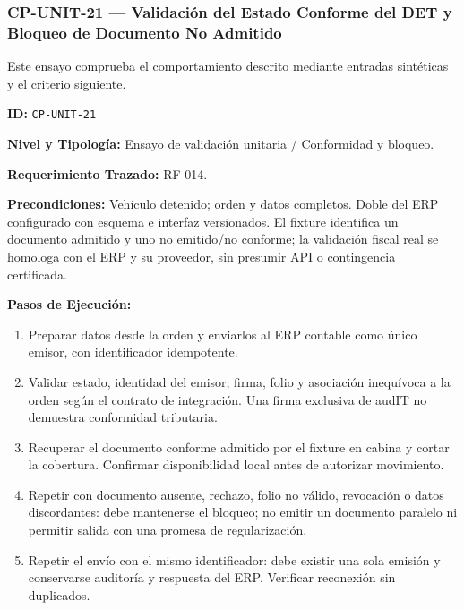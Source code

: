 \subsubsection*{CP-UNIT-21 — Validación del Estado Conforme del DET y Bloqueo de Documento No Admitido}\label{sec:9-cp-unit-21}
Este ensayo comprueba el comportamiento descrito mediante entradas sintéticas y el criterio siguiente.

\par\noindent\textbf{ID:} \texttt{C\allowbreak{}P\allowbreak{}-\allowbreak{}U\allowbreak{}N\allowbreak{}I\allowbreak{}T\allowbreak{}-\allowbreak{}2\allowbreak{}1\allowbreak{}}\par
\par\noindent\textbf{Nivel y Tipología:} Ensayo de validación unitaria / Conformidad y bloqueo.\par
\par\noindent\textbf{Requerimiento Trazado:} RF-014.\par
\par\noindent\textbf{Precondiciones:} Vehículo detenido; orden y datos completos. Doble del ERP configurado con esquema e interfaz versionados. El fixture identifica un documento admitido y uno no emitido/no conforme; la validación fiscal real se homologa con el ERP y su proveedor, sin presumir API o contingencia certificada.\par
\par\noindent\textbf{Pasos de Ejecución:} \par
\begin{enumerate}
\item Preparar datos desde la orden y enviarlos al ERP contable como único emisor, con identificador idempotente.
\item Validar estado, identidad del emisor, firma, folio y asociación inequívoca a la orden según el contrato de integración. Una firma exclusiva de audIT no demuestra conformidad tributaria.
\item Recuperar el documento conforme admitido por el fixture en cabina y cortar la cobertura. Confirmar disponibilidad local antes de autorizar movimiento.
\item Repetir con documento ausente, rechazo, folio no válido, revocación o datos discordantes: debe mantenerse el bloqueo; no emitir un documento paralelo ni permitir salida con una promesa de regularización.
\item Repetir el envío con el mismo identificador: debe existir una sola emisión y conservarse auditoría y respuesta del ERP. Verificar reconexión sin duplicados.
\end{enumerate}
